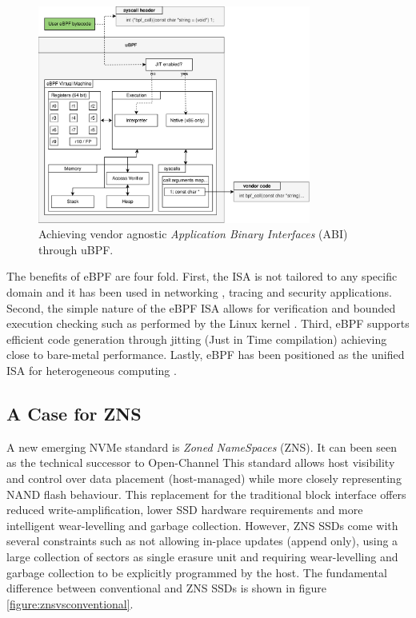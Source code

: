 \begin{figure}
    \centering
	\includegraphics[width=0.8\textwidth]{resources/images/ubpf-abi.pdf}
	\caption{Achieving vendor agnostic \textit{Application Binary Interfaces}
        (ABI) through uBPF.}
    \label{figure:ubpf-abi}
\end{figure}

The benefits of eBPF are four fold. First, the ISA is not tailored to any
specific domain and it has been used in networking \cite{xdp},
tracing \cite{enhanced-ebpf} and security \cite{seccomp} applications. Second,
the simple nature of the eBPF ISA allows for verification and bounded execution
checking such as performed by the Linux kernel \cite{kern-analysis}. Third, eBPF
supports efficient code generation through jitting (Just in Time compilation)
achieving close to bare-metal performance. Lastly, eBPF has been positioned as
the unified ISA for heterogeneous computing \cite{Brunella2020hXDPES, bpf-uapi}.

\subsection{A Case for ZNS}

A new emerging NVMe standard is \textit{Zoned NameSpaces} (ZNS). It can been
seen as the technical successor to Open-Channel %
This standard allows host visibility and control over data placement
(host-managed) while more closely representing NAND flash behaviour. This
replacement for the traditional block interface offers reduced
write-amplification, lower SSD hardware requirements and more intelligent
wear-levelling and garbage collection. However, ZNS SSDs come with several
constraints such as not allowing in-place updates (append only), using a large
collection of sectors as single erasure unit and requiring wear-levelling and
garbage collection to be explicitly programmed by the host. The fundamental
difference between conventional and ZNS SSDs is shown in figure
\ref{figure:znsvsconventional}.

